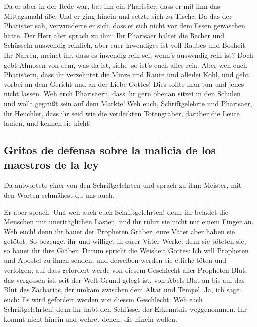  Da er aber in der Rede war, bat ihn ein Pharisäer, dass
er mit ihm das Mittagsmahl äße. Und er ging hinein und setzte sich zu
Tische.  Da das der Pharisäer sah, verwunderte er sich,
dass er sich nicht vor dem Essen gewaschen hätte.  Der
Herr aber sprach zu ihm: Ihr Pharisäer haltet die Becher und Schüsseln
auswendig reinlich, aber euer Inwendiges ist voll Raubes und Bosheit.
 Ihr Narren, meinet ihr, dass es inwendig rein sei,
wenn's auswendig rein ist?  Doch gebt Almosen von dem,
was da ist, siehe, so ist's euch alles rein.  Aber weh
euch Pharisäern, dass ihr verzehntet die Minze und Raute und allerlei
Kohl, und geht vorbei an dem Gericht und an der Liebe Gottes! Dies
sollte man tun und jenes nicht lassen.  Weh euch
Pharisäern, dass ihr gern obenan sitzet in den Schulen und wollt gegrüßt
sein auf dem Markte!  Weh euch, Schriftgelehrte und
Pharisäer, ihr Heuchler, dass ihr seid wie die verdeckten Totengräber,
darüber die Leute laufen, und kennen sie nicht!

\hypertarget{gritos-de-defensa-sobre-la-malicia-de-los-maestros-de-la-ley}{%
\subsection{Gritos de defensa sobre la malicia de los maestros de la
ley}\label{gritos-de-defensa-sobre-la-malicia-de-los-maestros-de-la-ley}}

 Da antwortete einer von den Schriftgelehrten und sprach
zu ihm: Meister, mit den Worten schmähest du uns auch.

 Er aber sprach: Und weh auch euch Schriftgelehrten! denn
ihr beladet die Menschen mit unerträglichen Lasten, und ihr rührt sie
nicht mit einem Finger an.  Weh euch! denn ihr bauet der
Propheten Gräber; eure Väter aber haben sie getötet.  So
bezeuget ihr und williget in eurer Väter Werke; denn sie töteten sie, so
bauet ihr ihre Gräber.  Darum spricht die Weisheit
Gottes: Ich will Propheten und Apostel zu ihnen senden, und derselben
werden sie etliche töten und verfolgen;  auf dass
gefordert werde von diesem Geschlecht aller Propheten Blut, das
vergossen ist, seit der Welt Grund gelegt ist,  von Abels
Blut an bis auf das Blut des Zacharias, der umkam zwischen dem Altar und
Tempel. Ja, ich sage euch: Es wird gefordert werden von diesem
Geschlecht.  Weh euch Schriftgelehrten! denn ihr habt den
Schlüssel der Erkenntnis weggenommen. Ihr kommt nicht hinein und wehret
denen, die hinein wollen.

